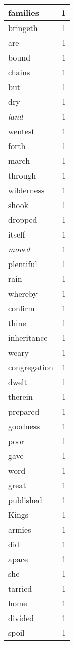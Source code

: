 \begin{center}
\begin{longtable}{l|r}
families & 1 \\ \hline
bringeth & 1 \\ \hline
are & 1 \\ \hline
bound & 1 \\ \hline
chains & 1 \\ \hline
but & 1 \\ \hline
dry & 1 \\ \hline
\emph{land} & 1 \\ \hline
wentest & 1 \\ \hline
forth & 1 \\ \hline
march & 1 \\ \hline
through & 1 \\ \hline
wilderness & 1 \\ \hline
shook & 1 \\ \hline
dropped & 1 \\ \hline
itself & 1 \\ \hline
\emph{moved} & 1 \\ \hline
plentiful & 1 \\ \hline
rain & 1 \\ \hline
whereby & 1 \\ \hline
confirm & 1 \\ \hline
thine & 1 \\ \hline
inheritance & 1 \\ \hline
weary & 1 \\ \hline
congregation & 1 \\ \hline
dwelt & 1 \\ \hline
therein & 1 \\ \hline
prepared & 1 \\ \hline
goodness & 1 \\ \hline
poor & 1 \\ \hline
gave & 1 \\ \hline
word & 1 \\ \hline
great & 1 \\ \hline
published & 1 \\ \hline
Kings & 1 \\ \hline
armies & 1 \\ \hline
did & 1 \\ \hline
apace & 1 \\ \hline
she & 1 \\ \hline
tarried & 1 \\ \hline
home & 1 \\ \hline
divided & 1 \\ \hline
spoil & 1 \\ \hline

\end{longtable}
\end{center}
